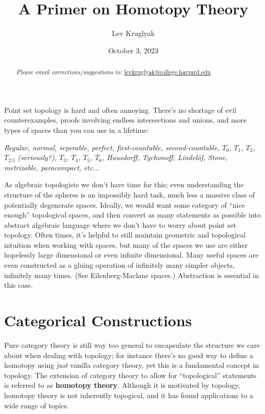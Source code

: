 \documentclass{article}
\title{\textbf{A Primer on Homotopy Theory}}
\date{October 3, 2023}
\author{Lev Kruglyak}
\begin{document}
\maketitle
\begin{abstract}

    \medskip
    \begin{center}
        \emph{Please email corrections/suggestions to:} \underline{levkruglyak@college.harvard.edu}
    \end{center}
\end{abstract}
\tableofcontents
\medskip

Point set topology is hard and often annoying. There's no shortage of evil counterexamples, proofs involving endless intersections and unions, and more types of spaces than you can use in a lifetime:

\begin{center}
  \emph{Regular, normal, seperable, perfect, first-countable, second-countable, $T_0$, $T_1$, $T_2$, $T_{2.5}$ (seriously?), $T_3$, $T_4$, $T_5$, $T_6$, Hausdorff, Tychonoff, Lindel\"of, Stone, metrizable, paracompact, etc...}
\end{center}

As algebraic topologists we don't have time for this; even understanding the structure of the spheres is an impossibly hard task, much less a massive class of potentially degenerate spaces. Ideally, we would want some category of ``nice enough'' topological spaces, and then convert as many statements as possible into abstract algebraic language where we don't have to worry about point set topology.
Often times, it's helpful to still maintain geometric and topological intuition when working with spaces, but many of the spaces we use are either hopelessly large dimensional or even infinite dimensional. Many useful spaces are even constructed as a gluing operation of infinitely many simpler objects, infinitely many times. (See Eilenberg-Maclane spaces.) Abstraction is essential in this case.

\section{Categorical Constructions}

Pure category theory is still way too general to encapsulate the structure we care about when dealing with topology; for instance there's no good way to define a homotopy using \emph{just} vanilla category theory, yet this is a fundamental concept in topology. The extension of category theory to allow for ``topological'' statements is referred to as \textbf{homotopy theory}. Although it is motivated by topology, homotopy theory is not inherently topogical, and it has found applications to a wide range of topics. 
\end{document}

